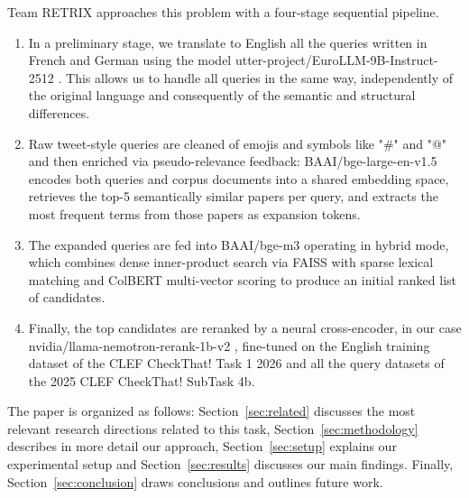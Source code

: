 Team RETRIX approaches this problem with a four-stage sequential pipeline.
\begin{enumerate}
    \item In a preliminary stage, we translate to English all the queries written in French and German using the model utter-project/EuroLLM-9B-Instruct-2512 \cite{utter_project_eurollm_9b_instruct_2512}. This allows us to handle all queries in the same way, independently of the original language and consequently of the semantic and structural differences.

    \item Raw tweet-style queries are cleaned of emojis and symbols like "\#" and "@" and then enriched via pseudo-relevance feedback: BAAI/bge-large-en-v1.5 \cite{bge-large-en-v1.5} encodes both queries and corpus documents into a shared embedding space, retrieves the top-5 semantically similar papers per query, and extracts the most frequent terms from those papers as expansion tokens.

    \item The expanded queries are fed into BAAI/bge-m3 \cite{bge-m3} operating in hybrid mode, which combines dense inner-product search via FAISS \cite{faiss_documentation} with sparse lexical matching and ColBERT multi-vector scoring to produce an initial ranked list of candidates.

    \item Finally, the top candidates are reranked by a neural cross-encoder, in our case nvidia/llama-nemotron-rerank-1b-v2 \cite{llama-nemotron-rerank-1b-v2}, fine-tuned on the English training dataset of the CLEF CheckThat! Task 1 2026 and all the query datasets of the 2025 CLEF CheckThat! SubTask 4b.
\end{enumerate}

The paper is organized as follows: Section~\ref{sec:related} discusses the most relevant research directions related to this task, Section~\ref{sec:methodology} describes in more detail our approach, Section~\ref{sec:setup} explains our experimental setup and Section~\ref{sec:results} discusses our main findings. Finally, Section~\ref{sec:conclusion} draws conclusions and outlines future work.